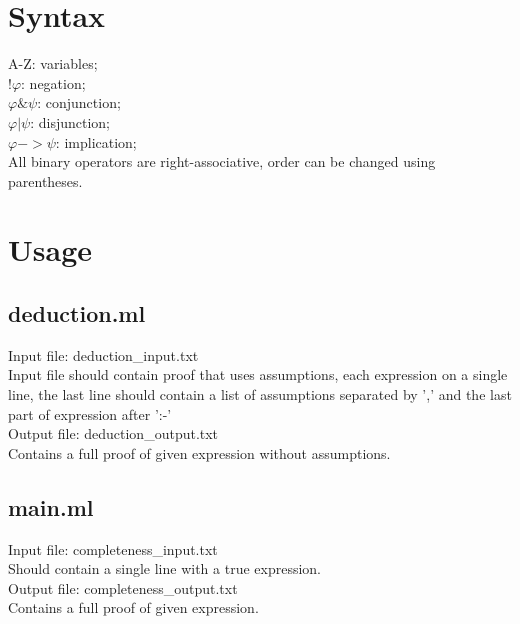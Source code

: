 \documentclass[12pt,a4paper,oneside]{article}
\begin{document}
\section{Syntax}
A-Z: variables;\\
$!\varphi$: negation;\\
$\varphi \& \psi$: conjunction;\\
$\varphi | \psi$: disjunction;\\
$\varphi -> \psi$: implication;\\

All binary operators are right-associative, order can be changed using parentheses.

\section{Usage}
\subsection{deduction.ml}
Input file: deduction\_input.txt\\
Input file should contain proof that uses assumptions, each expression on a single line, the last line should contain a list of assumptions separated by ',' and the last part of expression after ':-'\\

Output file: deduction\_output.txt\\
Contains a full proof of given expression without assumptions.

\subsection{main.ml}
Input file: completeness\_input.txt\\
Should contain a single line with a true expression.\\

Output file: completeness\_output.txt\\
Contains a full proof of given expression.
\end{document}
